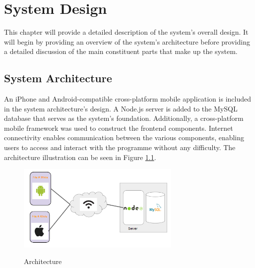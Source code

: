 \chapter{System Design}
This chapter will provide a detailed description of the system’s overall design. It will begin by providing an overview of the system’s architecture before providing a detailed discussion of the main constituent parts that make up the system. 

\section{System Architecture} 
An iPhone and Android-compatible cross-platform mobile application is included in the system architecture's design. A Node.js server is added to the MySQL database that serves as the system's foundation. Additionally, a cross-platform mobile framework was used to construct the frontend components. Internet connectivity enables communication between the various components, enabling users to access and interact with the programme without any difficulty. The architecture illustration can be seen in Figure \ref{image:architecture}.
\begin{figure}[h!]
    \includegraphics[width=0.7\textwidth]
    {images/Architecture.png}
    \centering
    \label{image:architecture}
    \caption{Architecture}
\end{figure}

